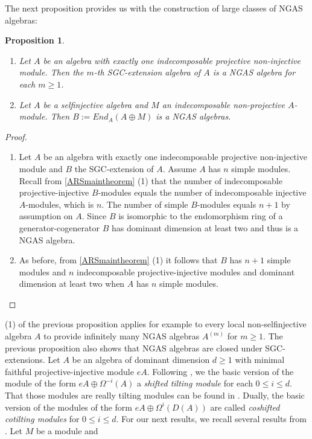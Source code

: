 \documentclass[a4paper]{amsart}
\newtheorem{proposition}[theorem]{Proposition}
\theoremstyle{definition}
\theoremstyle{remark}
\numberwithin{equation}{theorem}
\begin{document}
The next proposition provides us with the construction of large classes of NGAS algebras:
\begin{proposition}
\begin{enumerate}
\item Let $A$ be an algebra with exactly one indecomposable projective non-injective module. Then the $m$-th SGC-extension algebra of $A$ is a NGAS algebra for each $m \geq 1$.
\item Let $A$ be a selfinjective algebra and $M$ an indecomposable non-projective $A$-module. Then $B:=End_A(A \oplus M)$ is a NGAS algebras.
\end{enumerate}
\end{proposition}
\begin{proof}
\begin{enumerate}
\item 
Let $A$ be an algebra with exactly one indecomposable projective non-injective module and $B$ the SGC-extension of $A$. Assume $A$ has $n$ simple modules.
Recall from \ref{ARSmaintheorem} (1) that the number of indecomposable projective-injective $B$-modules equals the number of indecomposable injective $A$-modules, which is $n$. The number of simple $B$-modules equals $n+1$ by assumption on $A$.
Since $B$ is isomorphic to the endomorphism ring of a generator-cogenerator $B$ has dominant dimension at least two and thus is a NGAS algebra.
\item As before, from \ref{ARSmaintheorem} (1) it follows that $B$ has $n+1$ simple modules and $n$ indecomposable projective-injective modules and dominant dimension at least two when $A$ has $n$ simple modules.
\end{enumerate}
\end{proof}
(1) of the previous proposition applies for example to every local non-selfinjective algebra $A$ to provide infinitely many NGAS algebras $A^{(m)}$ for $m \geq 1$. The previous proposition also shows that NGAS algebras are closed under SGC-extensions.
Let $A$ be an algebra of dominant dimension $d \geq 1$ with minimal faithful projective-injective module $eA$.
Following \cite{PS}, we the basic version of the module of the form $eA \oplus \Omega^{-i}(A)$ a \emph{shifted tilting module} for each $0 \leq i \leq d$.
That those modules are really tilting modules can be found in \cite{PS}. Dually, the basic version of the modules of the form $eA \oplus \Omega^i(D(A))$ are called \emph{coshifted cotilting modules} for $0 \leq i \leq d$.
For our next results, we recall several results from \cite{BS}.
Let $M$ be a module and 
\end{document}
